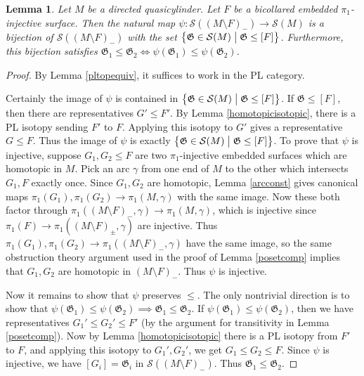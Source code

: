 \documentclass[12pt]{article}
\theoremstyle{plain}
\newtheorem{lemma}[theorem]{Lemma}
\theoremstyle{definition}
\theoremstyle{remark}
\numberwithin{equation}{section}
\begin{document}
\begin{lemma}\label{subposetone}
Let $M$ be a directed quasicylinder.  Let $F$ be a bicollared embedded $\pi_1$-injective surface.  Then the natural map $\psi:\mathcal S((M\setminus F)_-)\to\mathcal S(M)$ is a bijection of $\mathcal S((M\setminus F)_-)$ with the set $\left\{\mathfrak G\in\mathcal S(M)\bigm|\mathfrak G\leq[F]\right\}$.  Furthermore, this bijection satisfies $\mathfrak G_1\leq\mathfrak G_2\iff\psi(\mathfrak G_1)\leq\psi(\mathfrak G_2)$.
\end{lemma}

\begin{proof}
By Lemma \ref{pltopequiv}, it suffices to work in the PL category.

Certainly the image of $\psi$ is contained in $\left\{\mathfrak G\in\mathcal S(M)\bigm|\mathfrak G\leq[F]\right\}$.  If $\mathfrak G\leq[F]$, then there are representatives $G'\leq F'$.  By Lemma \ref{homotopicisotopic}, there is a PL isotopy sending $F'$ to $F$.  Applying this isotopy to $G'$ gives a representative $G\leq F$.  Thus the image of $\psi$ is exactly $\left\{\mathfrak G\in\mathcal S(M)\bigm|\mathfrak G\leq[F]\right\}$.  To prove that $\psi$ is injective, suppose $G_1,G_2\leq F$ are two $\pi_1$-injective embedded surfaces which are homotopic in $M$.  Pick an arc $\gamma$ from one end of $M$ to the other which intersects $G_1,F$ exactly once.  Since $G_1,G_2$ are homotopic, Lemma \ref{arcconst} gives canonical maps $\pi_1(G_1),\pi_1(G_2)\to\pi_1(M,\gamma)$ with the same image.  Now these both factor through $\pi_1((M\setminus F)_-,\gamma)\to\pi_1(M,\gamma)$, which is injective since $\pi_1(F)\to\pi_1((M\setminus F)_\pm,\gamma)$ are injective.  Thus $\pi_1(G_1),\pi_1(G_2)\to\pi_1((M\setminus F)_-,\gamma)$ have the same image, so the same obstruction theory argument used in the proof of Lemma \ref{posetcomp} implies that $G_1,G_2$ are homotopic in $(M\setminus F)_-$.  Thus $\psi$ is injective.

Now it remains to show that $\psi$ preserves $\leq$.  The only nontrivial direction is to show that $\psi(\mathfrak G_1)\leq\psi(\mathfrak G_2)\implies\mathfrak G_1\leq\mathfrak G_2$.  If $\psi(\mathfrak G_1)\leq\psi(\mathfrak G_2)$, then we have representatives $G_1'\leq G_2'\leq F'$ (by the argument for transitivity in Lemma \ref{posetcomp}).  Now by Lemma \ref{homotopicisotopic} there is a PL isotopy from $F'$ to $F$, and applying this isotopy to $G_1',G_2'$, we get $G_1\leq G_2\leq F$.  Since $\psi$ is injective, we have $[G_i]=\mathfrak G_i$ in $\mathcal S((M\setminus F)_-)$.  Thus $\mathfrak G_1\leq\mathfrak G_2$.
\end{proof}
\end{document}
